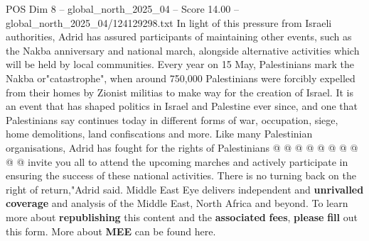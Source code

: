 \begin{textsample}{POS Dim 8 – global\_north\_2025\_04 – Score 14.00 – global\_north\_2025\_04/124129298.txt}
In light of this pressure from Israeli authorities, Adrid has assured participants of maintaining other events, such as the Nakba anniversary and national march, alongside alternative activities which will be held by local communities.
Every year on 15 May, Palestinians mark the Nakba or"catastrophe", when around 750,000 Palestinians were forcibly expelled from their homes by Zionist militias to make way for the creation of Israel.
It is an event that has shaped politics in Israel and Palestine ever since, and one that Palestinians say continues today in different forms of war, occupation, siege, home demolitions, land confiscations and more.
Like many Palestinian organisations, Adrid has fought for the rights of Palestinians @ @ @ @ @ @ @ @ @ @ invite you all to attend the upcoming marches and actively participate in ensuring the success of these national activities.
There is no turning back on the right of return,"Adrid said.
Middle East Eye delivers independent and \textbf{unrivalled} \textbf{coverage} and analysis of the Middle East, North Africa and beyond.
To learn more about \textbf{republishing} this content and the \textbf{associated} \textbf{fees}, \textbf{please} \textbf{fill} out this form.
More about \textbf{MEE} can be found here.

\end{textsample}

